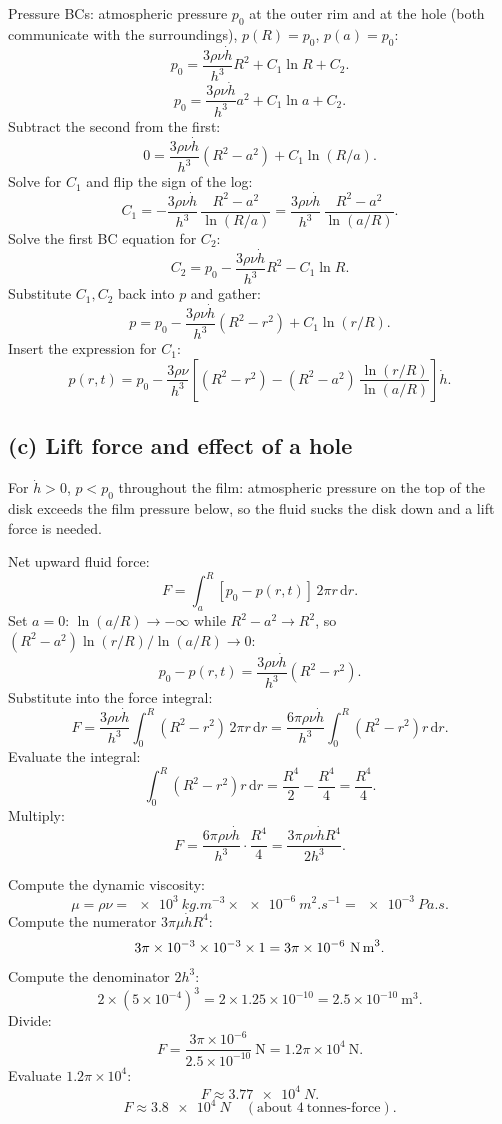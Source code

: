 \documentclass[11pt]{article}
\newcommand{\de}{\mathrm{d}}
\begin{document}
Pressure BCs: atmospheric pressure $p_0$ at the outer rim and at the hole (both communicate with the surroundings), $p(R)=p_0$, $p(a)=p_0$:
\[ p_0 = \frac{3\rho\nu\dot h}{h^3}R^2 + C_1\ln R + C_2. \]
\[ p_0 = \frac{3\rho\nu\dot h}{h^3}a^2 + C_1\ln a + C_2. \]
Subtract the second from the first:
\[ 0 = \frac{3\rho\nu\dot h}{h^3}(R^2-a^2) + C_1\ln(R/a). \]
Solve for $C_1$ and flip the sign of the log:
\[ C_1 = -\frac{3\rho\nu\dot h}{h^3}\,\frac{R^2-a^2}{\ln(R/a)} = \frac{3\rho\nu\dot h}{h^3}\,\frac{R^2-a^2}{\ln(a/R)}. \]
Solve the first BC equation for $C_2$:
\[ C_2 = p_0 - \frac{3\rho\nu\dot h}{h^3}R^2 - C_1\ln R. \]
Substitute $C_1,C_2$ back into $p$ and gather:
\[ p = p_0 - \frac{3\rho\nu\dot h}{h^3}(R^2-r^2) + C_1\ln(r/R). \]
Insert the expression for $C_1$:
\begin{equation}
\boxed{\;p(r,t) = p_0 - \frac{3\rho\nu}{h^3}\!\left[(R^2-r^2)-(R^2-a^2)\,\frac{\ln(r/R)}{\ln(a/R)}\right]\dot h.\;}
\label{eq:p-final}
\end{equation}

\subsection*{(c) Lift force and effect of a hole}

For $\dot h>0$, $p<p_0$ throughout the film: atmospheric pressure on the top of the disk exceeds the film pressure below, so the fluid sucks the disk down and a lift force is needed.

Net upward fluid force:
\[ F = \int_a^R [p_0 - p(r,t)]\,2\pi r\,\de r. \]
Set $a=0$: $\ln(a/R)\to -\infty$ while $R^2-a^2\to R^2$, so $(R^2-a^2)\ln(r/R)/\ln(a/R)\to 0$:
\[ p_0 - p(r,t) = \frac{3\rho\nu\dot h}{h^3}(R^2-r^2). \]
Substitute into the force integral:
\[ F = \frac{3\rho\nu\dot h}{h^3}\int_0^R (R^2-r^2)\,2\pi r\,\de r = \frac{6\pi\rho\nu\dot h}{h^3}\int_0^R (R^2-r^2)r\,\de r. \]
Evaluate the integral:
\[ \int_0^R (R^2-r^2)r\,\de r = \frac{R^4}{2}-\frac{R^4}{4} = \frac{R^4}{4}. \]
Multiply:
\begin{equation}
F = \frac{6\pi\rho\nu\dot h}{h^3}\cdot\frac{R^4}{4} = \frac{3\pi\rho\nu\dot h R^4}{2h^3}.
\label{eq:Fnohole}
\end{equation}

Compute the dynamic viscosity:
\[ \mu = \rho\nu = \SI{e3}{kg.m^{-3}}\times\SI{e-6}{m^2.s^{-1}} = \SI{e-3}{Pa.s}. \]
Compute the numerator $3\pi\mu\dot h R^4$:
\[ 3\pi\times 10^{-3}\times 10^{-3}\times 1 = 3\pi\times 10^{-6}~\text{N\,m}^3. \]
Compute the denominator $2h^3$:
\[ 2\times(5\times 10^{-4})^3 = 2\times 1.25\times 10^{-10} = 2.5\times 10^{-10}~\text{m}^3. \]
Divide:
\[ F = \frac{3\pi\times 10^{-6}}{2.5\times 10^{-10}}~\text{N} = 1.2\pi\times 10^{4}~\text{N}. \]
Evaluate $1.2\pi\times 10^4$:
\[ F \approx \SI{3.77e4}{N}. \]
\begin{equation}
\boxed{\;F \approx \SI{3.8e4}{N}\quad(\text{about } 4~\text{tonnes-force}).\;}
\end{equation}
\end{document}
